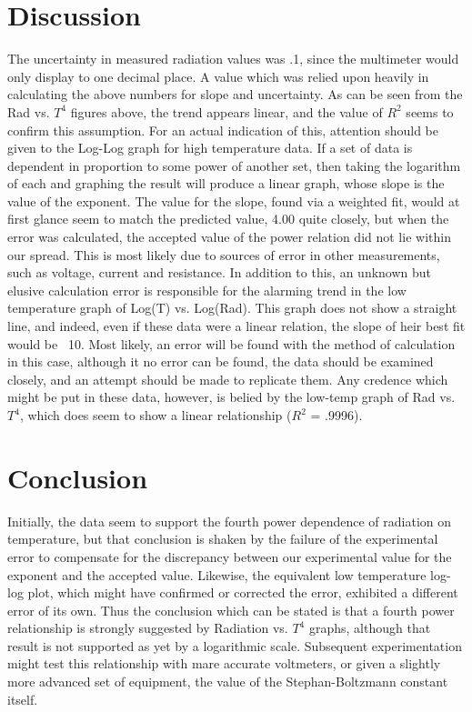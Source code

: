 \documentclass[aps,pre,twocolumn,nofootinbib]{revtex4}
\begin{document}
\section{Discussion}
The uncertainty in measured radiation values was .1, since the multimeter would only display to one decimal place.  A value which was relied upon heavily in calculating the above numbers for slope and uncertainty.  As can be seen from the Rad vs. $T^4$ figures above, the trend appears linear, and the value of $R^2$ seems to confirm this assumption. For an actual indication of this, attention should be given to the Log-Log graph for high temperature data.  If a set of data is dependent in proportion to some power of another set, then taking the logarithm of each and graphing the result will produce a linear graph, whose slope is the value of the exponent.   The value for the slope, found via a weighted fit, would at first glance seem to match the predicted value, 4.00 quite closely, but when the error was calculated, the accepted value of the power relation did not lie within our spread.  This is most likely due to sources of error in other measurements, such as voltage, current and resistance.  In addition to this, an unknown but elusive calculation error is responsible for the alarming trend in the low temperature graph of Log(T) vs. Log(Rad).  This graph does not show a straight line, and indeed, even if these data were a linear relation, the slope of heir best fit would be ~10.  Most likely, an error will be found with the method of calculation in this case, although it no error can be found, the data should be examined closely, and an attempt should be made to replicate them.  Any credence which might be put in these data, however, is belied by the low-temp graph of Rad vs. $T^4$, which does seem to show a linear relationship ($R^2$ = .9996).

\section{Conclusion}
Initially, the data seem to support the fourth power dependence of radiation on temperature, but that conclusion is shaken by the failure of the experimental error to compensate for the discrepancy between our experimental value for the exponent and the accepted value.  Likewise, the equivalent low temperature log-log plot, which might have confirmed or corrected the error, exhibited a different error of its own.  Thus the conclusion which can be stated is that a fourth power relationship is strongly suggested by Radiation vs. $T^4$ graphs, although that result is not supported as yet by a logarithmic scale.  Subsequent experimentation might test this relationship with mare accurate voltmeters, or given a slightly more advanced set of equipment, the value of the Stephan-Boltzmann constant itself.  
\end{document}

